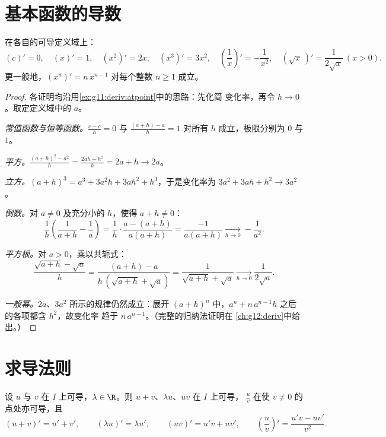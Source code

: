 \section{基本函数的导数}

\begin{proposition}\label{prop:g11:deriv:refderivatives}
在各自的可导定义域上：
\[
(c)' = 0, \quad
(x)' = 1, \quad
(x^2)' = 2x, \quad
(x^3)' = 3x^2, \quad
\left(\frac1x\right)' = -\frac{1}{x^2}, \quad
(\sqrt x\,)' = \frac{1}{2\sqrt x} \ (x > 0).
\]
更一般地，$(x^n)' = n\,x^{n-1}$ 对每个整数 $n \geq 1$ 成立。
\end{proposition}

\begin{proof}
各证明均沿用\cref{ex:g11:deriv:atpoint}中的思路：先化简
变化率，再令 $h \to 0$。取定定义域中的 $a$。

\emph{常值函数与恒等函数。}$\frac{c - c}{h} = 0$ 与
$\frac{(a+h) - a}{h} = 1$ 对所有 $h$ 成立，极限分别为 $0$ 与 $1$。

\emph{平方。}$\frac{(a+h)^2 - a^2}{h} = \frac{2ah + h^2}{h} = 2a + h
\to 2a$。

\emph{立方。}$(a+h)^3 = a^3 + 3a^2h + 3ah^2 + h^3$，于是变化率为
$3a^2 + 3ah + h^2 \to 3a^2$。

\emph{倒数。}对 $a \neq 0$ 及充分小的 $h$，使得
$a + h \neq 0$：
\[
\frac{1}{h}\left(\frac{1}{a+h} - \frac{1}{a}\right)
= \frac{1}{h} \cdot \frac{a - (a+h)}{a(a+h)}
= \frac{-1}{a(a+h)}
\xrightarrow[h \to 0]{} -\frac{1}{a^2}.
\]

\emph{平方根。}对 $a > 0$，乘以共轭式：
\[
\frac{\sqrt{a+h} - \sqrt a}{h}
= \frac{(a + h) - a}{h\,(\sqrt{a+h} + \sqrt a)}
= \frac{1}{\sqrt{a+h} + \sqrt a}
\xrightarrow[h \to 0]{} \frac{1}{2\sqrt a}.
\]

\emph{一般幂。}$2a$、$3a^2$ 所示的规律仍然成立：展开
$(a+h)^n$ 中，$a^n + n\,a^{n-1}h$ 之后的各项都含 $h^2$，故变化率
趋于 $n\,a^{n-1}$。（完整的归纳法证明在
\cref{ch:g12:deriv}中给出。）
\end{proof}

\section{求导法则}

\begin{theorem}[运算法则]\label{thm:g11:deriv:rules}
设 $u$ 与 $v$ 在 $I$ 上可导，$\lambda \in \R$。则
$u + v$、$\lambda u$、$uv$ 在 $I$ 上可导，
$\frac{u}{v}$ 在使 $v \neq 0$ 的点处亦可导，且
\[
(u+v)' = u' + v', \qquad
(\lambda u)' = \lambda u', \qquad
(uv)' = u'v + uv', \qquad
\left(\frac{u}{v}\right)' = \frac{u'v - uv'}{v^2}.
\]
\end{theorem}


